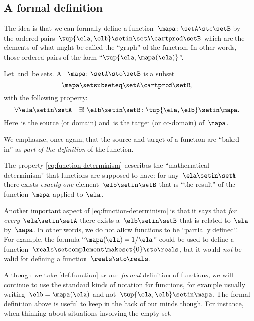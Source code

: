 \subsection{A formal definition}

The idea is that we can formally define a function~$\mapa\colon \setA \sto \setB$ by the ordered pairs~$\tup{\ela, \elb} \setin\setA \cartprod \setB$ which are the elements of what might be called the ``graph'' of the function.
In other words, those ordered pairs of the form ``$\tup{\ela, \mapa(\ela)}$''.

\begin{ctdefinition}[Function]
    \label{def:function}
    Let~\setA and~\setB be sets.
    A ~$\mapa\colon \setA \sto \setB$ is a subset
    \begin{equation}
        \mapa \setsubseteq \setA \cartprod \setB,
    \end{equation}
    with the following property:
    \begin{equation}
        \label{eq:function-determinism}
        \forall \ela \setin\setA \quad \exists !
        \ \elb \setin\setB \colon \tup{\ela,\elb} \setin\mapa.
    \end{equation}
    Here~\setA is the source (or domain) and~\setB is the target (or co-domain) of~$\mapa$.
\end{ctdefinition}

We emphasize, once again, that the source and target of a function are ``baked in'' as \emph{part of the definition} of the function.

The property \cref{eq:function-determinism} describes the ``mathematical determinism'' that functions are supposed to have: for any~$\ela \setin\setA$ there exists \emph{exactly one} element~$\elb \setin\setB$ that is ``the result'' of the function~$\mapa$ applied to~$\ela$.

Another important aspect of \cref{eq:function-determinism} is that it says that \emph{for every}~$\ela \setin\setA$ there exists a~$\elb \setin\setB$ that is related to~$\ela$ by~$\mapa$.
In other words, we do not allow functions to be ``partially defined''.
For example, the formula ``$\mapa(\ela) = 1/ \ela$'' could be used to define a function~$\reals \setcomplement \makeset{ 0 } \sto \reals$, but it would \emph{not} be valid for defining a function~$\reals \sto \reals$.

Although we take \cref{def:function} as our \emph{formal} definition of functions, we will continue to use the standard kinds of notation for functions, for example usually writing~$\elb = \mapa(\ela)$ and not~$\tup{\ela, \elb} \setin\mapa$.
The formal definition above is useful to keep in the back of our minds though.
For instance, when thinking about situations involving the empty set.

